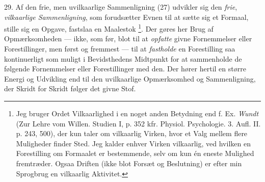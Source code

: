 \documentclass[12pt,a4paper,openany]{book}
\begin{document}
29. Af den frie, men uvilkaarlige Sammenligning (27) udvikler sig den
\emph{frie}, \emph{vilkaarlige Sammenligning}, som forudsætter Evnen til at
sætte sig et Formaal, stille sig en Opgave, fastslaa en Maalestok%
\footnote[1]{Jeg bruger Ordet Vilkaarlighed i en noget anden Betydning end f.
Ex. \emph{Wundt} (Zur Lehre vom Willen. Studien I, p. 352 kfr. Physiol.
Psychologie. 3. Aufl. II. p. 243, 500), der kun taler om vilkaarlig Virken,
hvor et Valg mellem flere Muligheder finder Sted. Jeg kalder enhver Virken
vilkaarlig, ved hvilken en Forestilling om Formaalet er bestemmende, selv om
kun én eneste Mulighed fremtræder. Ogsaa Driften (ikke blot Forsæt og
Beslutning) er efter min Sprogbrug en vilkaarlig Aktivitet.}. Der gøres her
Brug af Opmærksomheden --- ikke, som før, blot til at \emph{opfatte} givne
Fornemmelser eller Forestillinger, men først og fremmest --- til at
\emph{fastholde} en Forestilling saa kontinuerligt som muligt i Bevidsthedens
Midtpunkt for at sammenholde de følgende Fornemmelser eller Forestillinger med
den. Der hører hertil en større Energi og Udvikling end til den uvilkaarlige
Opmærksomhed og Sammenligning, der Skridt for Skridt følger det givne Stof.
\end{document}
